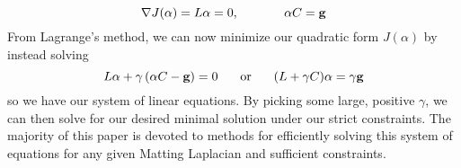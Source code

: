 \[\nabla J(\alpha)=L\alpha=0,\hspace{.5in}\alpha C=\textbf{g}\]
From Lagrange's method, we can now minimize our quadratic form $J(\alpha)$ by instead solving
\[L\alpha+\gamma\left(\alpha C-\textbf{g}\right) = 0
	\hspace{.2in}\text{ or }\hspace{.2in}
	(L+\gamma C)\alpha = \gamma \textbf{g}\]
so we have our system of linear equations. By picking some large, positive $\gamma$, we can then solve for our desired minimal solution under our strict constraints. The majority of this paper is devoted to methods for efficiently solving this system of equations for any given Matting Laplacian and sufficient constraints.